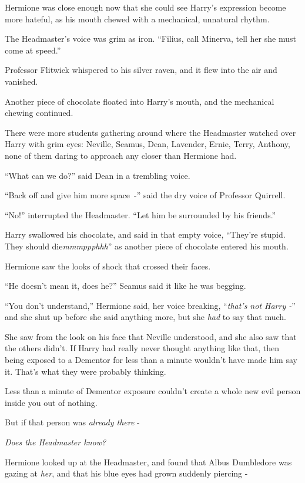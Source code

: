 Hermione was close enough now that she could see Harry's expression become more hateful, as his mouth chewed with a mechanical, unnatural rhythm.

The Headmaster's voice was grim as iron. ``Filius, call Minerva, tell her she must come at speed.''

Professor Flitwick whispered to his silver raven, and it flew into the air and vanished.

Another piece of chocolate floated into Harry's mouth, and the mechanical chewing continued.

There were more students gathering around where the Headmaster watched over Harry with grim eyes: Neville, Seamus, Dean, Lavender, Ernie, Terry, Anthony, none of them daring to approach any closer than Hermione had.

``What can we do?'' said Dean in a trembling voice.

``Back off and give him more space~-'' said the dry voice of Professor Quirrell.

``No!'' interrupted the Headmaster. ``Let him be surrounded by his friends.''

Harry swallowed his chocolate, and said in that empty voice, ``They're stupid. They should die\emph{mmmppphhh}'' as another piece of chocolate entered his mouth.

Hermione saw the looks of shock that crossed their faces.

``He doesn't mean it, does he?'' Seamus said it like he was begging.

``You don't understand,'' Hermione said, her voice breaking, ``\emph{that's not Harry -}'' and she shut up before she said anything more, but she \emph{had} to say that much.

She saw from the look on his face that Neville understood, and she also saw that the others didn't. If Harry had really never thought anything like that, then being exposed to a Dementor for less than a minute wouldn't have made him say it. That's what they were probably thinking.

Less than a minute of Dementor exposure couldn't create a whole new evil person inside you out of nothing.

But if that person was \emph{already there} -

\emph{Does the Headmaster know?}

Hermione looked up at the Headmaster, and found that Albus Dumbledore was gazing at \emph{her}, and that his blue eyes had grown suddenly piercing -

